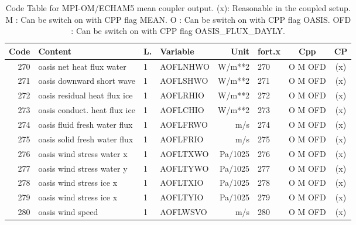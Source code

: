 \begin{table}
\begin{footnotesize}
\begin{tabular}{r|l|l|l|r|l|c|c}
Code & Content  		       &  L.   &  Variable	&   Unit    &	fort.x &  Cpp     & CP  \\ \hline
270  & oasis net heat flux water       &  1    &  AOFLNHWO	&   W/m**2  &	270    &  O M OFD & (x) \\
271  & oasis downward short wave       &  1    &  AOFLSHWO	&   W/m**2  &	271    &  O M OFD & (x) \\
272  & oasis residual heat flux ice    &  1    &  AOFLRHIO	&   W/m**2  &	272    &  O M OFD & (x) \\
273  & oasis conduct. heat flux ice    &  1    &  AOFLCHIO	&   W/m**2  &	273    &  O M OFD & (x) \\
274  & oasis fluid fresh water flux    &  1    &  AOFLFRWO	&   m/s     &	274    &  O M OFD & (x) \\
275  & oasis solid fresh water flux    &  1    &  AOFLFRIO	&   m/s     &	275    &  O M OFD & (x) \\
276  & oasis wind stress water x       &  1    &  AOFLTXWO	&   Pa/1025 &	276    &  O M OFD & (x) \\
277  & oasis wind stress water y       &  1    &  AOFLTYWO	&   Pa/1025 &	277    &  O M OFD & (x) \\
278  & oasis wind stress ice x         &  1    &  AOFLTXIO	&   Pa/1025 &	278    &  O M OFD & (x) \\
279  & oasis wind stress ice x         &  1    &  AOFLTYIO	&   Pa/1025 &	279    &  O M OFD & (x) \\
280  & oasis wind speed 	       &  1    &  AOFLWSVO	&   m/s     &	280    &  O M OFD & (x) \\

\end{tabular}
\end{footnotesize}
\caption{Code Table for MPI-OM/ECHAM5 mean coupler output. \newline
(x): Reasonable in the coupled setup.\newline
 M : Can be switch on with CPP flag MEAN.\newline
 O : Can be switch on with CPP flag OASIS. \newline
 OFD : Can be switch on with CPP flag OASIS\_FLUX\_DAYLY.}
\label{tb:diagnostic:output:meanoasis}
\end{table}




\clearpage



  

